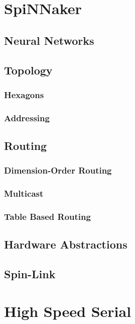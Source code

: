 \documentclass[a4paper,12pt,titlepage]{report}
\begin{document}
		\section{SpiNNaker}
			
			\subsection{Neural Networks}
			
			\subsection{Topology}
				
				\subsubsection{Hexagons}
				
				\subsubsection{Addressing}
			
			\subsection{Routing}
				
				\subsubsection{Dimension-Order Routing}
				
				\subsubsection{Multicast}
				
				\subsubsection{Table Based Routing}
			
			\subsection{Hardware Abstractions}
			
			\subsection{Spin-Link}
		
		
		\section{High Speed Serial}
	
\end{document}
